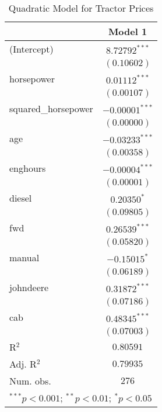 
\begin{table}
\begin{center}
\begin{tabular}{l c}
\hline
 & Model 1 \\
\hline
(Intercept)         & $8.72792^{***}$  \\
                    & $(0.10602)$      \\
horsepower          & $0.01112^{***}$  \\
                    & $(0.00107)$      \\
squared\_horsepower & $-0.00001^{***}$ \\
                    & $(0.00000)$      \\
age                 & $-0.03233^{***}$ \\
                    & $(0.00358)$      \\
enghours            & $-0.00004^{***}$ \\
                    & $(0.00001)$      \\
diesel              & $0.20350^{*}$    \\
                    & $(0.09805)$      \\
fwd                 & $0.26539^{***}$  \\
                    & $(0.05820)$      \\
manual              & $-0.15015^{*}$   \\
                    & $(0.06189)$      \\
johndeere           & $0.31872^{***}$  \\
                    & $(0.07186)$      \\
cab                 & $0.48345^{***}$  \\
                    & $(0.07003)$      \\
\hline
R$^2$               & $0.80591$        \\
Adj. R$^2$          & $0.79935$        \\
Num. obs.           & $276$            \\
\hline
\multicolumn{2}{l}{\scriptsize{$^{***}p<0.001$; $^{**}p<0.01$; $^{*}p<0.05$}}
\end{tabular}
\caption{Quadratic Model for Tractor Prices}
\label{tab:reg_sq_horse}
\end{center}
\end{table}
